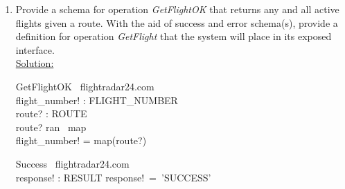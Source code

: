 \documentclass[12pt]{article}
\begin{document}
\begin{enumerate}
\begin{schema}{GetRouteOK}
\Xi \ flightradar24.com\\
flight\_number? : FLIGHT\_NUMBER \\
route! : ROUTE\\
\where
flight\_number? \in active\\
route! = map(flight\_number?)
\end{schema}

\begin{schema}{Success}
\Xi \ flightradar24.com\\
response! : RESULT
\where
response!~=~'SUCCESS'\\
\end{schema}

\begin{schema}{RouteNotFound}
\Xi \ flightradar24.com\\
flight\_number? : FLIGHT\_NUMBER\\
response! : RESULT
\ST
flight\_number? \notin active\\
response!~=~'Since~flight\_number?~is~not~active~, unable~to~find~route'
\end{schema}


\[ GetRoute~\hat{=}~\\
~~~(GetRouteOK \wedge Success) \oplus RouteNotFound \]




\item Provide a schema for operation \emph{GetFlightOK} that returns any and all active
flights given a route. With the aid of success and error schema(s), provide a definition
for operation \emph{GetFlight} that the system will place in its exposed interface. \\
\noindent \underline{Solution:}\\


\begin{schema}{GetFlightOK}
\Xi \ flightradar24.com\\
flight\_number! : FLIGHT\_NUMBER \\
route? : ROUTE\\
\where
route? \in ran \ map \\
flight\_number! = map(route?) \\
\end{schema}

\begin{schema}{Success}
\Xi \ flightradar24.com\\
response! : RESULT
\where
response!~=~'SUCCESS'\\
\end{schema}


\end{enumerate}
\end{document}
